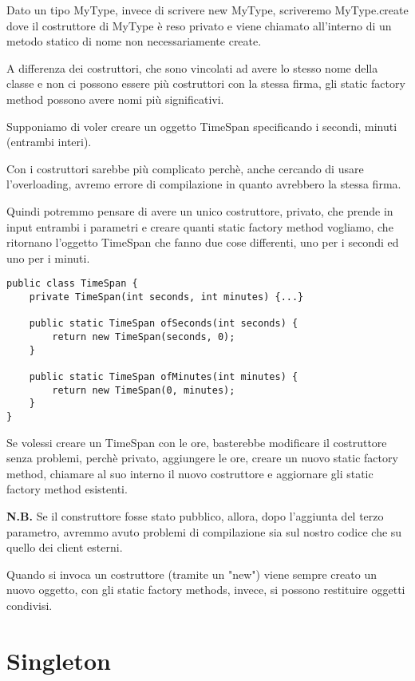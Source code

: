 Dato un tipo MyType, invece di scrivere new MyType, scriveremo MyType.create dove il costruttore di MyType è reso privato e viene chiamato all'interno di un metodo 
statico di nome non necessariamente create.

A differenza dei costruttori, che sono vincolati ad avere lo stesso nome della classe e non ci possono essere più costruttori con la stessa firma, gli static factory 
method possono avere nomi più significativi.

Supponiamo di voler creare un oggetto TimeSpan specificando i secondi, minuti (entrambi interi).

Con i costruttori sarebbe più complicato perchè, anche cercando di usare l'overloading, avremo errore di compilazione in quanto avrebbero la stessa firma.

Quindi potremmo pensare di avere un unico costruttore, privato, che prende in input entrambi i parametri e creare quanti static factory method vogliamo, che ritornano
l'oggetto TimeSpan che fanno due cose differenti, uno per i secondi ed uno per i minuti.

\begin{lstlisting}
public class TimeSpan {
    private TimeSpan(int seconds, int minutes) {...}

    public static TimeSpan ofSeconds(int seconds) {
        return new TimeSpan(seconds, 0);
    }

    public static TimeSpan ofMinutes(int minutes) {
        return new TimeSpan(0, minutes);
    }
}
\end{lstlisting}

Se volessi creare un TimeSpan con le ore, basterebbe modificare il costruttore senza problemi, perchè privato, aggiungere le ore, creare un nuovo static factory method, 
chiamare al suo interno il nuovo costruttore e aggiornare gli static factory method esistenti.

\medskip
\textbf{N.B.} Se il construttore fosse stato pubblico, allora, dopo l'aggiunta del terzo parametro, avremmo avuto problemi di compilazione sia sul nostro codice che su 
quello dei client esterni.
\medskip

Quando si invoca un costruttore (tramite un "new") viene sempre creato un nuovo oggetto, con gli static factory methods, invece, si possono restituire oggetti condivisi.

\section{Singleton}

